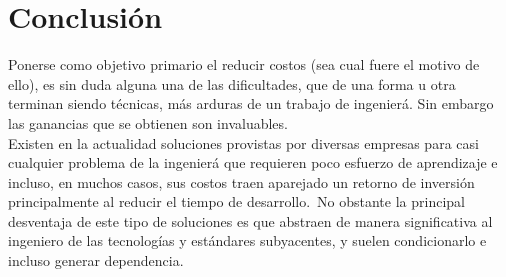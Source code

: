 \chapter{Conclusi\'on} %

Ponerse como objetivo primario el reducir costos (sea cual fuere el motivo de
ello), es sin duda alguna una de las dificultades, que de una forma u otra
terminan siendo t\'ecnicas, m\'as arduras de un trabajo de ingenier\'a. Sin
embargo las ganancias que se obtienen son invaluables.\\

Existen en la actualidad soluciones provistas por diversas empresas para casi
cualquier problema de la ingenier\'a que requieren poco esfuerzo de aprendizaje
e incluso, en muchos casos, sus costos traen aparejado un retorno de
inversi\'on principalmente al reducir el tiempo de desarrollo.\
No obstante la principal desventaja de este tipo de soluciones es que abstraen
de manera significativa al ingeniero de las tecnolog\'ias y est\'andares
subyacentes, y suelen condicionarlo e incluso generar dependencia.\\



